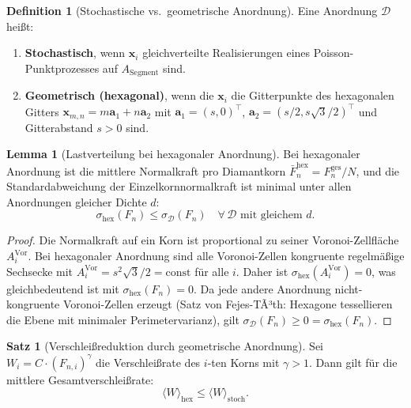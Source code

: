 ﻿\documentclass[a4paper,12pt]{article}
\theoremstyle{definition}
\newtheorem{definition}{Definition}
\newtheorem{satz}{Satz}
\newtheorem{lemma}{Lemma}
\begin{document}
\begin{definition}[Stochastische vs.\ geometrische Anordnung]
Eine Anordnung $\mathcal{D}$ heißt:
\begin{enumerate}
\item \textbf{Stochastisch}, wenn $\mathbf{x}_i$ gleichverteilte Realisierungen
      eines Poisson-Punktprozesses auf $A_{\mathrm{Segment}}$ sind.
\item \textbf{Geometrisch (hexagonal)}, wenn die $\mathbf{x}_i$ die Gitterpunkte
      des hexagonalen Gitters $\mathbf{x}_{m,n} = m\mathbf{a}_1 + n\mathbf{a}_2$
      mit $\mathbf{a}_1 = (s, 0)^\top$, $\mathbf{a}_2 = (s/2, s\sqrt{3}/2)^\top$
      und Gitterabstand $s > 0$ sind.
\end{enumerate}
\end{definition}

\begin{lemma}[Lastverteilung bei hexagonaler Anordnung]
\label{lem:hexagonal}
Bei hexagonaler Anordnung ist die mittlere Normalkraft pro Diamantkorn
$\bar{F}_n^{\mathrm{hex}} = F_n^{\mathrm{ges}} / N$, und die Standardabweichung
der Einzelkornnormalkraft ist minimal unter allen Anordnungen gleicher Dichte $d$:
\[
\sigma_{\mathrm{hex}}(F_n) \leq \sigma_{\mathcal{D}}(F_n) \quad \forall\, \mathcal{D}
\text{ mit gleichem } d.
\]
\end{lemma}

\begin{proof}
Die Normalkraft auf ein Korn ist proportional zu seiner Voronoi-Zellfläche
$A_i^{\mathrm{Vor}}$. Bei hexagonaler Anordnung sind alle Voronoi-Zellen kongruente
regelmäßige Sechsecke mit $A_i^{\mathrm{Vor}} = s^2\sqrt{3}/2 = \mathrm{const}$ für alle $i$.
Daher ist $\sigma_{\mathrm{hex}}(A_i^{\mathrm{Vor}}) = 0$, was gleichbedeutend ist mit
$\sigma_{\mathrm{hex}}(F_n) = 0$. Da jede andere Anordnung nicht-kongruente Voronoi-Zellen
erzeugt (Satz von Fejes-TÃ³th: Hexagone tessellieren die Ebene mit minimaler Perimetervarianz),
gilt $\sigma_{\mathcal{D}}(F_n) \geq 0 = \sigma_{\mathrm{hex}}(F_n)$.
\end{proof}

\begin{satz}[Verschleißreduktion durch geometrische Anordnung]
\label{satz:verschleiss}
Sei $W_i = C \cdot (F_{n,i})^{\gamma}$ die Verschleißrate des $i$-ten Korns mit $\gamma > 1$.
Dann gilt für die mittlere Gesamtverschleißrate:
\[
\langle W \rangle_{\mathrm{hex}} \leq \langle W \rangle_{\mathrm{stoch}}.
\]
\end{satz}
\end{document}
